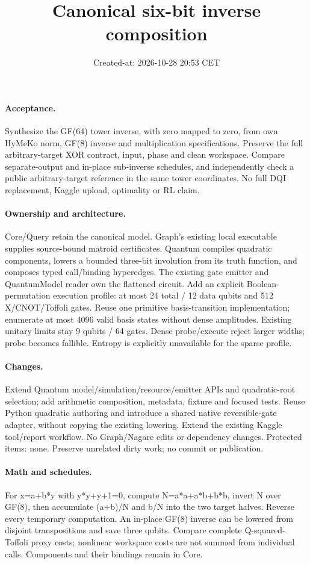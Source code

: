 \documentclass{article}
\title{Canonical six-bit inverse composition}
\date{Created-at: 2026-10-28 20:53 CET}
\begin{document}
\maketitle
\paragraph{Acceptance.} Synthesize the GF(64) tower inverse, with zero mapped
to zero, from own HyMeKo norm, GF(8) inverse and multiplication specifications.
Preserve the full arbitrary-target XOR contract, input, phase and clean workspace.
Compare separate-output and in-place sub-inverse schedules, and independently
check a public arbitrary-target reference in the same tower coordinates. No full
DQI replacement, Kaggle upload, optimality or RL claim.
\paragraph{Ownership and architecture.} Core/Query retain the canonical model.
Graph's existing local executable supplies source-bound matroid certificates.
Quantum compiles quadratic components, lowers a bounded three-bit involution
from its truth function, and composes typed call/binding hyperedges. The existing
gate emitter and QuantumModel reader own the flattened circuit. Add an explicit
Boolean-permutation execution profile: at most 24 total / 12 data qubits and
512 X/CNOT/Toffoli gates. Reuse one primitive basis-transition implementation;
enumerate at most 4096 valid basis states without dense amplitudes. Existing
unitary limits stay 9 qubits / 64 gates. Dense probe/execute reject larger widths;
probe becomes fallible. Entropy is explicitly unavailable for the sparse profile.
\paragraph{Changes.} Extend Quantum model/simulation/resource/emitter APIs and
quadratic-root selection; add arithmetic composition, metadata, fixture and
focused tests. Reuse Python quadratic authoring and introduce a shared native
reversible-gate adapter, without copying the existing lowering. Extend the
existing Kaggle tool/report workflow. No Graph/Nagare edits or dependency changes.
Protected items: none. Preserve unrelated dirty work; no commit or publication.
\paragraph{Math and schedules.} For x=a+b*y with y*y+y+1=0, compute
N=a*a+a*b+b*b, invert N over GF(8), then accumulate (a+b)/N and b/N into
the two target halves. Reverse every temporary computation. An in-place GF(8)
inverse can be lowered from disjoint transpositions and save three qubits.
Compare complete Q-squared-Toffoli proxy costs; nonlinear workspace costs are
not summed from individual calls. Components and their bindings remain in Core.
\end{document}
